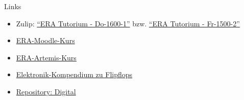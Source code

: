 \documentclass[
  german,            %
  aspectratio=169,    %
]{tumbeamer}
\begin{document}
\begin{frame}[c, fragile]{Links}{}
	\begin{itemize}
		\item Zulip: \href{https://zulip.in.tum.de/#narrow/stream/2661-ERA-Tutorium---Do-1600-1}{\enquote{ERA Tutorium - Do-1600-1}}
		      bzw. \href{https://zulip.in.tum.de/#narrow/stream/2675-ERA-Tutorium---Fr-1500-2 }{\enquote{ERA Tutorium - Fr-1500-2}}
		\item \href{https://www.moodle.tum.de/course/view.php?id=100633}{ERA-Moodle-Kurs}
		\item \href{https://artemis.in.tum.de/courses/401}{ERA-Artemis-Kurs}
		\item \href{https://www.elektronik-kompendium.de/sites/dig/0209301.htm}{Elektronik-Kompendium zu Flipflops}
		\item \href{https://github.com/hneemann/Digital}{Repository: Digital}
	\end{itemize}
\end{frame}

\maketitle
\end{document}
